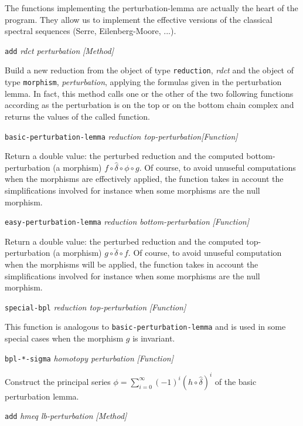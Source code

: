 The functions implementing the perturbation-lemma are
actually the heart of the program. They allow us
to implement the effective versions of the classical spectral sequences 
(Serre, Eilenberg-Moore, ...). 
\vskip 0.35cm 
{\parindent=0mm
{\leftskip=5mm 
{\tt add} {\em rdct perturbation} \hfill {\em [Method]} \par}
{\leftskip=15mm 
Build a new reduction from the  object of type {\tt reduction}, {\em rdct} and 
the  object of type {\tt morphism},  {\em perturbation}, 
applying the formulas given in the perturbation lemma. In fact, this 
method calls  one or the other of the two following functions according as the perturbation is on the top
or on the bottom chain complex and returns the values of the called function. \par}
{\leftskip=5mm 
{\tt basic-perturbation-lemma} {\em reduction top-perturbation}\hfill {\em [Function]} \par} 
{\leftskip=15mm 
Return a double value: the perturbed reduction and the computed bottom-perturbation (a morphism)
$f \circ {\hat \delta}\circ  \phi \circ g$. Of course, to avoid unuseful computations when the morphisms
are effectively applied, the function takes in account the simplifications involved for instance when
some morphisms are the null morphism. \par}
{\leftskip=5mm 
{\tt easy-perturbation-lemma} {\em reduction bottom-perturbation} \hfill {\em [Function]} \par} 
{\leftskip=15mm 
Return a double value: the perturbed reduction and the computed top-perturbation (a morphism)
$g \circ {\check \delta} \circ f$. Of course, to avoid unuseful computation when the morphisms
will be applied, the function takes in account the simplifications involved for instance when
some morphisms are the null morphism. \par}
{\leftskip=5mm 
{\tt special-bpl} {\em reduction top-perturbation} \hfill {\em [Function]} \par} 
{\leftskip=15mm 
This function is analogous to {\tt basic-perturbation-lemma} and is used in some special cases
when the morphism $g$ is invariant. \par}
{\leftskip=5mm 
{\tt bpl-*-sigma} {\em  homotopy perturbation} \hfill {\em [Function]} \par} 
{\leftskip=15mm 
Construct the principal series
$\phi=\sum_{i=0}^{\infty}{(-1)^i(h \circ  \hat{\delta})^i}$ of the basic
perturbation lemma. \par}
{\leftskip=5mm 
{\tt add} {\em  hmeq lb-perturbation} \hfill {\em [Method]} \par} 
}
